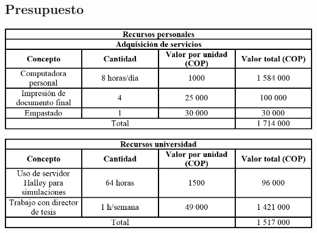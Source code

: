 \documentclass[12pt]{report}
\begin{document}
\subsection*{Presupuesto}

\begin{center}
    \includegraphics[width=\textwidth]{images/presupuesto.png}
\end{center}



\printbibliography
\end{document}
